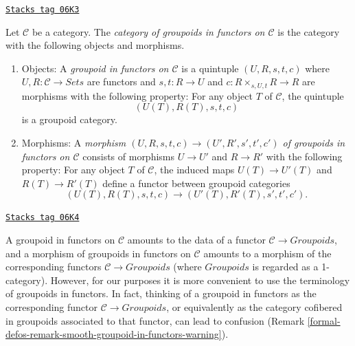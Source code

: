 \begin{definition}
\label{formal-defos-definition-groupoid-in-functors}
\href{https://stacks.math.columbia.edu/tag/06K3}{\texttt{Stacks tag 06K3}}

Let $\mathcal{C}$ be a category. The
{\it category of groupoids in functors on $\mathcal{C}$}
is the category with the following objects and morphisms.
\begin{enumerate}
\item Objects: A {\it groupoid in functors on $\mathcal{C}$} is a quintuple
$(U, R, s, t, c)$ where $U, R : \mathcal{C} \to \textit{Sets}$ are
functors and $s, t : R \to U$ and $c : R \times_{s, U, t} R \to R$
are morphisms with the following property: For any object $T$ of $\mathcal{C}$,
the quintuple
$$
(U(T), R(T), s, t, c)
$$
is a groupoid category.
\item Morphisms: A {\it morphism $(U, R, s, t, c) \to (U', R', s', t', c')$ of
groupoids in functors on $\mathcal{C}$} consists of morphisms $U \to U'$
and $R \to R'$ with the following property: For any object $T$ of
$\mathcal{C}$, the induced maps $U(T) \to U'(T)$ and
$R(T) \to R'(T)$ define a functor between groupoid categories
$$
(U(T), R(T), s, t, c) \to (U'(T), R'(T), s', t', c').
$$
\end{enumerate}
\end{definition}

\begin{remark}
\label{formal-defos-remark-confusion-groupoids-in-functors}
\href{https://stacks.math.columbia.edu/tag/06K4}{\texttt{Stacks tag 06K4}}

A groupoid in functors on $\mathcal{C}$ amounts to the data of a functor
$\mathcal{C} \to \textit{Groupoids}$, and a morphism of groupoids
in functors on $\mathcal{C}$ amounts to a morphism of the corresponding
functors
$\mathcal{C} \to \textit{Groupoids}$ (where
$\textit{Groupoids}$ is regarded as a 1-category).  However, for our
purposes it is more convenient to use the terminology of groupoids in functors.
In fact, thinking of a groupoid in functors as the corresponding functor
$\mathcal{C} \to \textit{Groupoids}$, or equivalently as the
category cofibered in groupoids associated to that functor, can lead to
confusion (Remark \ref{formal-defos-remark-smooth-groupoid-in-functors-warning}).
\end{remark}

